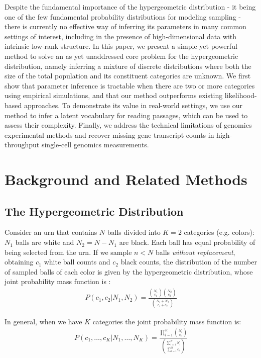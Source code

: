 \documentclass{article}
\theoremstyle{plain}
\theoremstyle{definition}
\theoremstyle{remark}
\begin{document}
Despite the fundamental importance of the hypergeometric distribution - it being one of the few fundamental probability distributions for modeling sampling - there is currently no effective way of inferring its parameters in many common settings of interest, including in the presence of high-dimensional data with intrinsic low-rank structure. In this paper, we present a simple yet powerful method to solve an as yet unaddressed core problem for the hypergeometric distribution, namely inferring a mixture of discrete distributions where both the size of the total population and its constituent categories are unknown. We first show that parameter inference is tractable when there are two or more categories using empirical simulations, and that our method outperforms existing likelihood-based approaches. To demonstrate its value in real-world settings, we use our method to infer a latent vocabulary for reading passages, which can be used to assess their complexity. Finally, we address the technical limitations of genomics experimental methods and recover missing gene transcript counts in high-throughput single-cell genomics measurements.

\section{Background and Related Methods}
\subsection{The Hypergeometric Distribution}
Consider an urn that contains $N$ balls divided into $K=2$ categories (e.g. colors): $N_1$ balls are white and $N_2 = N - N_1$ are black. Each ball has equal probability of being selected from the urn. If we sample $n<N$ balls \textit{without replacement}, obtaining $c_1$ white ball counts and $c_2$ black counts, the distribution of the number of sampled balls of each color is given by the hypergeometric distribution, whose joint probability mass function is \citep{Moivre1711}:
\begin{align}
    P(c_1,c_2|N_1,N_2) = \frac{\binom{N_1}{c_1} \binom{N_2}{c_2}}{\binom{N_1+N_2}{c_1+c_2}}
\end{align}

In general, when we have $K$ categories the joint probability mass function is:
\begin{align}
    P(c_1,\ldots,c_K|N_1,\ldots,N_K) = \frac{\prod_{i=1}^K \binom{N_i}{c_i}}{\binom{\sum_{i=1}^K N_i}{\sum_{i=1}^K c_i}}
\end{align}
\end{document}
